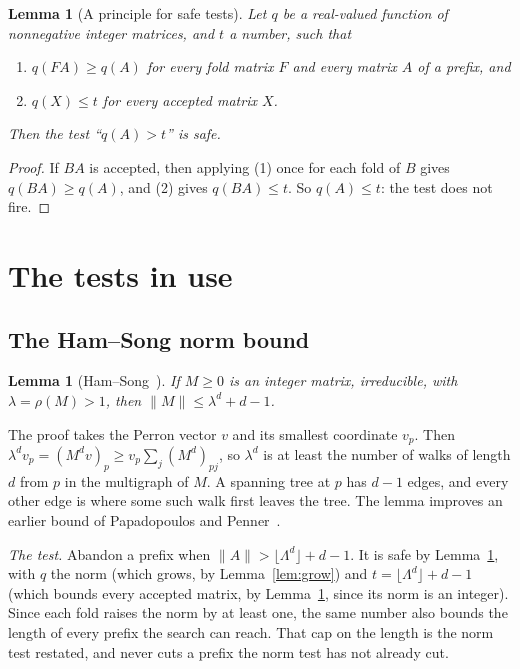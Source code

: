\documentclass[11pt]{amsart}
\newcommand{\lam}{\lambda}
\newcommand{\Lam}{\Lambda}
\newcommand{\nrm}[1]{\lVert #1\rVert}
\theoremstyle{plain}
\newtheorem{Lemma}[Theorem]{Lemma}
\theoremstyle{definition}
\begin{document}
\begin{Lemma}[A principle for safe tests]
  \label{lem:principle}
  Let $q$ be a real-valued function of nonnegative integer matrices, and
  $t$ a number, such that
  \begin{enumerate}
  \item $q(FA)\ge q(A)$ for every fold matrix $F$ and every matrix $A$ of a
    prefix, and
  \item $q(X)\le t$ for every accepted matrix $X$.
  \end{enumerate}
  Then the test ``$q(A)>t$'' is safe.
\end{Lemma}

\begin{proof}
  If $BA$ is accepted, then applying (1) once for each fold of $B$ gives
  $q(BA)\ge q(A)$, and (2) gives $q(BA)\le t$.  So $q(A)\le t$: the test
  does not fire.
\end{proof}

\section{The tests in use}
\label{sec:existing}

\subsection{The Ham--Song norm bound}

\begin{Lemma}[{Ham--Song~\cite[Lemma 3.1]{HamSong}}]
  \label{lem:hs}
  If $M\ge0$ is an integer matrix, irreducible, with $\lam=\rho(M)>1$,
  then $\nrm{M}\le\lam^d+d-1$.
\end{Lemma}

The proof takes the Perron vector $v$ and its smallest coordinate $v_p$.
Then $\lam^dv_p=(M^dv)_p\ge v_p\sum_j(M^d)_{pj}$, so $\lam^d$ is at least
the number of walks of length $d$ from $p$ in the multigraph of $M$.  A
spanning tree at $p$ has $d-1$ edges, and every other edge is where some
such walk first leaves the tree.  The lemma improves an earlier bound of
Papadopoulos and Penner~\cite{PapadopoulosPenner}.

\emph{The test.}  Abandon a prefix when $\nrm{A}>\lfloor\Lam^d\rfloor+d-1$.
It is safe by Lemma~\ref{lem:principle}, with $q$ the norm (which grows,
by Lemma~\ref{lem:grow}) and $t=\lfloor\Lam^d\rfloor+d-1$ (which bounds
every accepted matrix, by Lemma~\ref{lem:hs}, since its norm is an
integer).  Since each fold raises the norm by at least one, the same
number also bounds the length of every prefix the search can reach.  That
cap on the length is the norm test restated, and never cuts a prefix the
norm test has not already cut.
\end{document}
